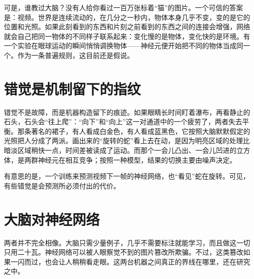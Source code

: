 可是，谁教过大脑？没有人给你看过一百万张标着“猫”的图片。一个可信的答案是：视频。世界是连续流动的，在几分之一秒内，物体本身几乎不变，变的是它的位置和光照。如果此刻看到的东西和片刻之前看到的东西之间的连接会增强，网络就会自己把同一物体的不同样子联系起来：变化慢的是物体，变化快的是环境。有一个实验在眼球运动的瞬间悄悄调换物体——神经元便开始把不同的物体当成同一个。作为一条普遍规则，这目前还是假说。

\section*{错觉是机制留下的指纹}

错觉不是故障，而是机器构造留下的痕迹。如果眼睛长时间盯着瀑布，再看静止的石头，石头会“往上爬”：“向下”和“向上”这一对通道中的一个疲劳了，两者失去平衡。那条著名的裙子，有人看成白金色，有人看成蓝黑色，它按照大脑默默假定的光照把人分成了两派。画出来的“旋转的蛇”看上去在动，是因为明亮区域的处理比暗淡区域稍快一点，时间差被读成了运动。而那个一会儿凸出、一会儿凹进的立方体，是两群神经元在相互竞争；按照一种模型，结果的切换主要由噪声决定。

有意思的是，一个训练来预测视频下一帧的神经网络，也“看见”蛇在旋转。可见，有些错觉是会预测所必须付出的代价。

\section*{大脑对神经网络}

两者并不完全相像。大脑只需少量例子，几乎不需要标注就能学习，而且做这一切只用二十瓦。神经网络可以被人眼察觉不到的图片篡改所欺骗。不过，这类篡改如果一闪而过，也会让人稍稍看走眼。这两台机器之间真正的界线在哪里，还在研究之中。

